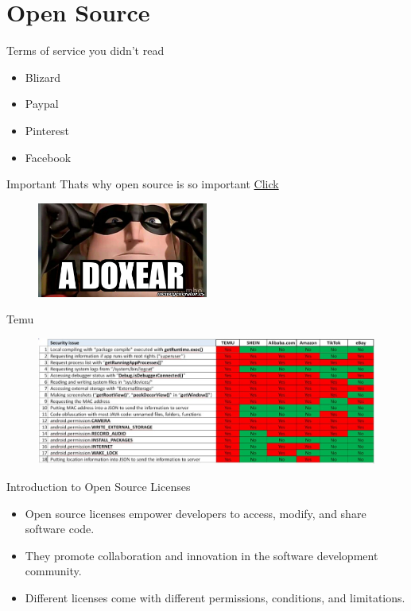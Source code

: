 \documentclass[10pt]{beamer}
\begin{document}
\section{Open Source}
    \begin{frame}{Terms of service you didn't read }
      \begin{itemize}
        \item Blizard
        \item Paypal
        \item Pinterest
        \item Facebook
      \end{itemize}
      \begin{alertblock}{Important}
        Thats why open source is so important \newline
        \href{https://tosdr.org/}{Click}
      \end{alertblock}
      \begin{figure}[h]
        \centering
        \includegraphics[width=0.5\textwidth]{figures/DoxingMeme.jpg}
        \label{fig:my_label}
        \end{figure}
    \end{frame}
    \begin{frame}{Temu}
        \begin{figure}[h]
            \centering
            \includegraphics[width=1.0\textwidth]{figures/TemuWarning.jpg}
            \label{fig:temu}
        \end{figure}

    \end{frame}

    \begin{frame}{Introduction to Open Source Licenses}
      \begin{itemize}
          \item Open source licenses empower developers to access, modify, and share software code.
          \item They promote collaboration and innovation in the software development community.
          \item Different licenses come with different permissions, conditions, and limitations.
      \end{itemize}
  \end{frame}
\end{document}

